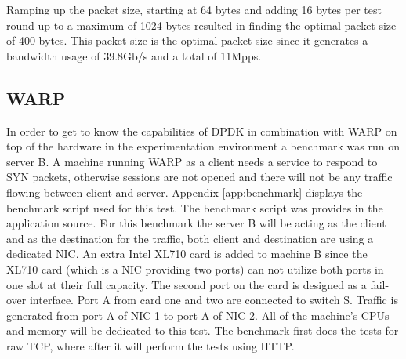 Ramping up the packet size, starting at 64 bytes and adding 16 bytes per test round up to a maximum of 1024 bytes resulted in finding the optimal packet size of 400 bytes. 
This packet size is the  optimal packet size since it generates a bandwidth usage of 39.8Gb/s and a total of 11Mpps. 




\subsection{WARP}\label{sub:warp}
In order to get to know the capabilities of DPDK in combination with WARP on top of the hardware in the experimentation environment a benchmark was run on server B.
A machine running WARP as a client needs a service to respond to SYN packets, otherwise sessions are not opened and there will not be any traffic flowing between client and server. 
Appendix \ref{app:benchmark} displays the benchmark script used for this test. The benchmark script was provides in the application source.
For this benchmark the server B  will be acting as the client and as the destination for the traffic, both client and destination are using a dedicated NIC. 
An extra Intel XL710 card is added to machine B since the XL710 card (which is a NIC providing two ports) can not utilize both ports in one slot at their full capacity\cite{intellinuxguidxl710}.
The second port on the card is designed as a fail-over interface. 
Port A from card one and two are connected to switch S. 
Traffic is generated from port A of NIC 1 to port A of NIC 2.
All of the machine's CPUs and memory will be dedicated to this test. 
The benchmark first does the tests for raw TCP, where after it will perform the tests using HTTP.

